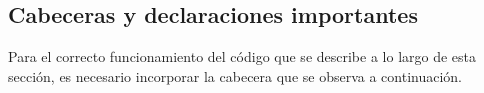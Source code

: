 %	
%	
%	
%	
%	
%	
%
%	
%
	
\subsection{Cabeceras y declaraciones importantes}
	Para el correcto funcionamiento del código que se describe a lo largo de esta sección, es necesario incorporar la cabecera que se observa a continuación.
	

